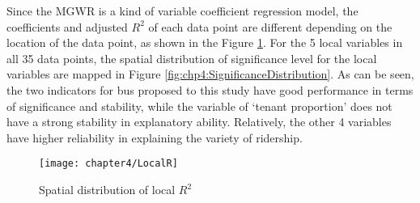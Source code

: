 %
Since the MGWR is a kind of variable coefficient regression model, the coefficients and adjusted $R^2$ of each data point are different depending on the location of the data point, as shown in the Figure \ref{fig:chp4:LocalR}. For the 5 local variables in all 35 data points, the spatial distribution of significance level for the local variables are mapped in Figure \ref{fig:chp4:SignificanceDistribution}. As can be seen, the two indicators for bus proposed to this study have good performance in terms of significance and stability, while the variable of ‘tenant proportion’ does not have a strong stability in explanatory ability. Relatively, the other 4 variables have higher reliability in explaining the variety of ridership.

\begin{figure}[htbp]
	\centering
	\normalsize
	\texttt{[image: chapter4/LocalR]}
	\caption{Spatial distribution of local $R^2$}
	\label{fig:chp4:LocalR}
\end{figure}


